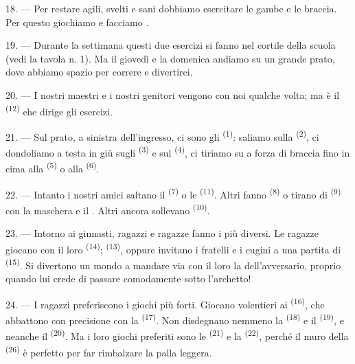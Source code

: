 18. --- Per restare agili, svelti e sani dobbiamo esercitare le gambe e le braccia.
Per questo giochiamo e facciamo .

19. --- Durante la settimana questi due esercizi si fanno nel cortile della scuola
(vedi la tavola n. 1). Ma il giovedì e la domenica andiamo su un grande prato, dove
abbiamo spazio per correre e divertirci.

20. --- I nostri maestri e i nostri genitori vengono con noi qualche volta; ma è il
 \textsuperscript{(12)} che dirige gli esercizi.

21. --- Sul prato, a sinistra dell'ingresso, ci sono gli 
\textsuperscript{(1)}: saliamo sulla  \textsuperscript{(2)}, ci
dondoliamo a testa in giù sugli  \textsuperscript{(3)} e sul
 \textsuperscript{(4)}, ci tiriamo su a forza di braccia fino in cima
alla  \textsuperscript{(5)} o alla 
\textsuperscript{(6)}.

22. --- Intanto i nostri amici saltano il  \textsuperscript{(7)} o le
 \textsuperscript{(11)}. Altri fanno 
\textsuperscript{(8)} o tirano di  \textsuperscript{(9)} con la
maschera e il . Altri ancora sollevano 
\textsuperscript{(10)}.

\VUsaut{4.6mm}
\VUsaut{3.0mm}

23. --- Intorno ai ginnasti, ragazzi e ragazze fanno i  più diversi. Le
ragazze giocano con il loro  \textsuperscript{(14)};  \textsuperscript{(13)}, oppure invitano i fratelli e i cugini a una partita
di  \textsuperscript{(15)}. Si divertono un mondo a mandare via con il
loro  la  dell'avversario, proprio quando lui
crede di passare comodamente sotto l'archetto!

24. --- I ragazzi preferiscono i giochi più forti. Giocano volentieri ai
 \textsuperscript{(16)}, che abbattono con precisione con la
 \textsuperscript{(17)}. Non disdegnano nemmeno la 
\textsuperscript{(18)} e il  \textsuperscript{(19)}, e neanche il
 \textsuperscript{(20)}. Ma i loro giochi preferiti sono le
 \textsuperscript{(21)} e la 
\textsuperscript{(22)}, perché il muro della  \textsuperscript{(26)} è
perfetto per far rimbalzare la palla leggera.

